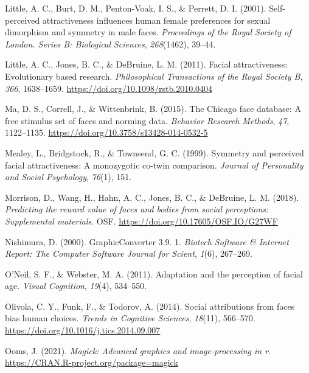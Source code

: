 \documentclass[
  doc,floatsintext]{apa6}
\newlength{\cslhangindent}
\newlength{\cslentryspacingunit} %
\newenvironment{CSLReferences}[2] %
 {%
  \setlength{\parindent}{0pt}
  \ifodd #1
  \let\oldpar\par
  \def\par{\hangindent=\cslhangindent\oldpar}
  \fi
  \setlength{\parskip}{#2\cslentryspacingunit}
 }%
 {}
\begin{document}
\begin{CSLReferences}{1}{0}
\leavevmode{}%
Little, A. C., Burt, D. M., Penton-Voak, I. S., \& Perrett, D. I. (2001). Self-perceived attractiveness influences human female preferences for sexual dimorphism and symmetry in male faces. \emph{Proceedings of the Royal Society of London. Series B: Biological Sciences}, \emph{268}(1462), 39--44.

\leavevmode{}%
Little, A. C., Jones, B. C., \& DeBruine, L. M. (2011). Facial attractiveness: Evolutionary based research. \emph{Philosophical Transactions of the Royal Society B}, \emph{366}, 1638--1659. \url{https://doi.org/10.1098/rstb.2010.0404}

\leavevmode{}%
Ma, D. S., Correll, J., \& Wittenbrink, B. (2015). The {Chicago} face database: A free stimulus set of faces and norming data. \emph{Behavior Research Methods}, \emph{47}, 1122--1135. \url{https://doi.org/10.3758/s13428-014-0532-5}

\leavevmode{}%
Mealey, L., Bridgstock, R., \& Townsend, G. C. (1999). Symmetry and perceived facial attractiveness: A monozygotic co-twin comparison. \emph{Journal of Personality and Social Psychology}, \emph{76}(1), 151.

\leavevmode{}%
Morrison, D., Wang, H., Hahn, A. C., Jones, B. C., \& DeBruine, L. M. (2018). \emph{Predicting the reward value of faces and bodies from social perceptions: Supplemental materials}. OSF. \url{https://doi.org/10.17605/OSF.IO/G27WF}

\leavevmode{}%
Nishimura, D. (2000). GraphicConverter 3.9. 1. \emph{Biotech Software \& Internet Report: The Computer Software Journal for Scient}, \emph{1}(6), 267--269.

\leavevmode{}%
O'Neil, S. F., \& Webster, M. A. (2011). Adaptation and the perception of facial age. \emph{Visual Cognition}, \emph{19}(4), 534--550.

\leavevmode{}%
Olivola, C. Y., Funk, F., \& Todorov, A. (2014). Social attributions from faces bias human choices. \emph{Trends in Cognitive Sciences}, \emph{18}(11), 566--570. \url{https://doi.org/10.1016/j.tics.2014.09.007}

\leavevmode{}%
Ooms, J. (2021). \emph{Magick: Advanced graphics and image-processing in r}. \url{https://CRAN.R-project.org/package=magick}


\end{CSLReferences}
\end{document}
